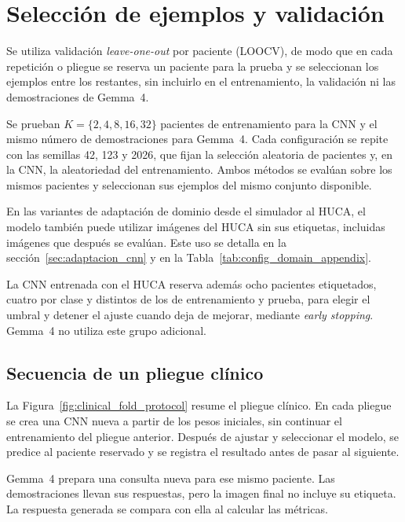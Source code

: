 \section{Selección de ejemplos y validación}
\label{sec:validacion_comun}

Se utiliza validación \textit{leave-one-out} por paciente (LOOCV), de modo que en cada repetición o pliegue se reserva un paciente para la prueba y se seleccionan los ejemplos entre los restantes, sin incluirlo en el entrenamiento, la validación ni las demostraciones de Gemma~4.

Se prueban \(K=\{2,4,8,16,32\}\) pacientes de entrenamiento para la CNN y el mismo número de demostraciones para Gemma~4. Cada configuración se repite con las semillas 42, 123 y 2026, que fijan la selección aleatoria de pacientes y, en la CNN, la aleatoriedad del entrenamiento. Ambos métodos se evalúan sobre los mismos pacientes y seleccionan sus ejemplos del mismo conjunto disponible.

En las variantes de adaptación de dominio desde el simulador al HUCA, el modelo también puede utilizar imágenes del HUCA sin sus etiquetas, incluidas imágenes que después se evalúan. Este uso se detalla en la sección~\ref{sec:adaptacion_cnn} y en la Tabla~\ref{tab:config_domain_appendix}.

La CNN entrenada con el HUCA reserva además ocho pacientes etiquetados, cuatro por clase y distintos de los de entrenamiento y prueba, para elegir el umbral y detener el ajuste cuando deja de mejorar, mediante \textit{early stopping}. Gemma~4 no utiliza este grupo adicional.

\subsection{Secuencia de un pliegue clínico}

La Figura~\ref{fig:clinical_fold_protocol} resume el pliegue clínico. En cada pliegue se crea una CNN nueva a partir de los pesos iniciales, sin continuar el entrenamiento del pliegue anterior. Después de ajustar y seleccionar el modelo, se predice al paciente reservado y se registra el resultado antes de pasar al siguiente.

\begin{samepage}
Gemma~4 prepara una consulta nueva para ese mismo paciente. Las demostraciones llevan sus respuestas, pero la imagen final no incluye su etiqueta. La respuesta generada se compara con ella al calcular las métricas.
\par
\end{samepage}

